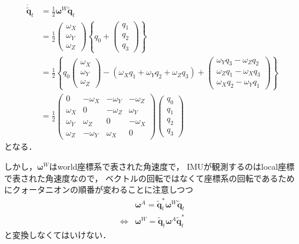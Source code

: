 {\tiny
  \begin{align}
    \dot{\tilde{\boldsymbol{q}}}_{t} &= \frac{1}{2} \boldsymbol{\omega}^{W} \tilde{\boldsymbol{q}}_{t}\\
    &= \frac{1}{2}
    \begin{pmatrix}
      \omega_X\\
      \omega_Y\\
      \omega_Z
    \end{pmatrix}
    \left\{q_0 +
    \begin{pmatrix}
      q_1\\
      q_2\\
      q_3
    \end{pmatrix}\right\}\\
    &= \frac{1}{2}
    \left\{
    q_0
    \begin{pmatrix}
      \omega_X\\
      \omega_Y\\
      \omega_Z
    \end{pmatrix}
    - \left( \omega_X q_1 + \omega_Y q_2 + \omega_Z q_3 \right) +
    \begin{pmatrix}
      \omega_Y q_3 - \omega_Z q_2\\
      \omega_Z q_1 - \omega_X q_3\\
      \omega_X q_2 - \omega_Y q_1
    \end{pmatrix}\right\}\\
    &= \frac{1}{2}
    \begin{pmatrix}
      0 & - \omega_X & - \omega_Y & - \omega_Z\\
      \omega_X & 0 & -\omega_Z & \omega_Y\\
      \omega_Y & \omega_Z & 0 & -\omega_X\\
      \omega_Z & - \omega_Y & \omega_X & 0
    \end{pmatrix}
    \begin{pmatrix}
      q_0\\
      q_1\\
      q_2\\
      q_3
    \end{pmatrix}
  \end{align}
}
となる．

しかし，$\boldsymbol{\omega}^{W}$はworld座標系で表された角速度で，
IMUが観測するのはlocal座標で表された角速度なので，
ベクトルの回転ではなくて座標系の回転であるためにクォータニオンの順番が変わることに注意しつつ
\begin{align}
  & \boldsymbol{\omega}^{A} = \tilde{\boldsymbol{q}}^{\ast}_{t} \boldsymbol{\omega}^{W} \tilde{\boldsymbol{q}}_{t}\\
  \Leftrightarrow& \boldsymbol{\omega}^{W} = \tilde{\boldsymbol{q}}_{t} \boldsymbol{\omega}^{A} \tilde{\boldsymbol{q}}^{\ast}_{t}
\end{align}
と変換しなくてはいけない．

